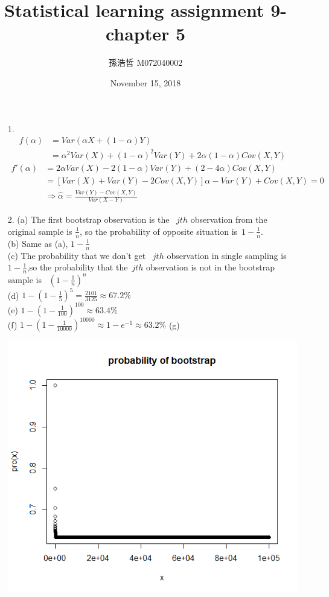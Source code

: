 \documentclass[12pt]{article}}
\title{Statistical learning assignment 9- chapter 5}
\author{孫浩哲 \hspace{0.7cm} M072040002}
\date{November 15, 2018}
\begin{document}
\maketitle
\begin{itemize}
\item[1.]
\begin{align*}
f(\alpha)
&=Var(\alpha X+(1-\alpha)Y)\\
&=\alpha^2Var(X)+(1-\alpha)^2Var(Y)+2\alpha(1-\alpha)Cov(X,Y)
\end{align*}
\begin{align*}
f'(\alpha)
&=2\alpha Var(X)-2(1-\alpha)Var(Y)+(2-4\alpha)Cov(X,Y)\\
&=[Var(X)+Var(Y)-2Cov(X,Y)]\alpha-Var(Y)+Cov(X,Y)=0\\[3ex]
&\Rightarrow\hat{\alpha}=\frac{Var(Y)-Cov(X,Y)}{Var(X-Y)}
\end{align*}
\item[2.]
(a)
The first bootstrap observation is the \ $jth$ observation from the original sample is $\frac{1}{n}$,
so the probability of opposite situation is\ $1-\frac{1}{n}$.\\[2ex]
(b)
Same as (a), $1-\frac{1}{n}$\\[2ex]
(c)
The probability that we don't get \ $jth$ observation in single sampling is $1-\frac{1}{n}$,so the probability that the\ $jth$ observation is not in the bootstrap sample is \ $(1-\frac{1}{n})^n$\\[2ex]
(d)
$1-(1-\frac{1}{5})^5=\frac{2101}{3125}\approx67.2\%$\\[2ex]
(e)
$1-(1-\frac{1}{100})^{100}\approx63.4\%$\\[2ex]
(f)
$1-(1-\frac{1}{10000})^{10000}\approx1-e^{-1}\approx63.2\%$
\newpage
(g)\\
\raggedright{\includegraphics[width=0.8\linewidth]{bootstrap}}\\[2ex]

\end{itemize}
\end{document}
